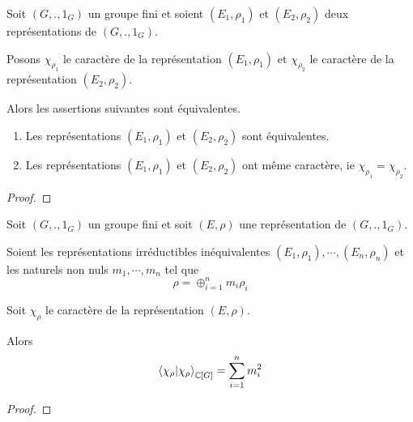 \begin{corollary}
	Soit $(G, ., 1_{G})$ un groupe fini et soient $(E_{1},
	\rho_{1})$ et $(E_{2}, \rho_{2})$
	deux représentations de $(G, ., 1_{G})$.

	Posons $\chi_{\rho_{1}}$ le caractère de la représentation $(E_{1},
	\rho_{1})$ et $\chi_{\rho_{2}}$ le caractère de la
	représentation $(E_{2}, \rho_{2})$.

	Alors les assertions suivantes sont équivalentes.
	\begin{enumerate}
		\item Les représentations $(E_{1},
			\rho_{1})$ et $(E_{2}, \rho_{2})$ sont équivalentes.
		\item Les représentations $(E_{1},
			\rho_{1})$ et $(E_{2}, \rho_{2})$ ont même caractère, ie
			$\chi_{\rho_{1}} = \chi_{\rho_{2}}$.

	\end{enumerate}
\end{corollary}

\ifdefined\outputproof
\begin{proof}

\end{proof}
\fi

\begin{proposition}
	Soit $(G, ., 1_{G})$ un groupe fini et soit $(E, \rho)$
	une représentation de $(G, ., 1_{G})$.

	Soient les représentations irréductibles inéquivalentes $(E_{1},
	\rho_{1}), \cdots, (E_{n},
	\rho_{n})$ et les naturels non nuls $m_{1}, \cdots,
	m_{n}$ tel que
	\begin{equation}
		\rho = \oplus_{i = 1}^{n} m_{i} \rho_{i}
	\end{equation}

	Soit $\chi_{\rho}$ le caractère de la représentation $(E,
	\rho)$.

	Alors
	\begin{equation}
		\bra{\chi_{\rho}}\ket{\chi_{\rho}}_{\mathbb{C}[G]} = \sum_{i = 1}^{n}
		m_{i}^{2}
	\end{equation}
\end{proposition}

\ifdefined\outputproof
\begin{proof}

\end{proof}
\fi


